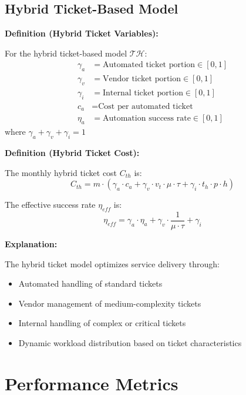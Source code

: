 \documentclass[12pt,a4paper]{article}
\newenvironment{definition}[1]
{\begin{mdframed}[style=definitionstyle]
\textbf{Definition (#1):}\par}
{\end{mdframed}}
\newenvironment{explanation}
{\begin{mdframed}[style=explanationstyle]
\textbf{Explanation:}\par}
{\end{mdframed}}
\begin{document}
\subsection{Hybrid Ticket-Based Model}
\begin{definition}{Hybrid Ticket Variables}
For the hybrid ticket-based model $\mathcal{TH}$:
\begin{align*}
    \gamma_a &= \text{Automated ticket portion} \in [0,1] \\
    \gamma_v &= \text{Vendor ticket portion} \in [0,1] \\
    \gamma_i &= \text{Internal ticket portion} \in [0,1] \\
    c_a &= \text{Cost per automated ticket} \\
    \eta_a &= \text{Automation success rate} \in [0,1]
\end{align*}
where $\gamma_a + \gamma_v + \gamma_i = 1$
\end{definition}

\begin{definition}{Hybrid Ticket Cost}
The monthly hybrid ticket cost $C_{th}$ is:
\begin{equation}
    C_{th} = m \cdot (\gamma_a \cdot c_a + \gamma_v \cdot v_t \cdot \mu \cdot \tau + \gamma_i \cdot t_h \cdot p \cdot h)
\end{equation}

The effective success rate $\eta_{eff}$ is:
\begin{equation}
    \eta_{eff} = \gamma_a \cdot \eta_a + \gamma_v \cdot \frac{1}{\mu \cdot \tau} + \gamma_i
\end{equation}
\end{definition}

\begin{explanation}
The hybrid ticket model optimizes service delivery through:
\begin{itemize}
    \item Automated handling of standard tickets
    \item Vendor management of medium-complexity tickets
    \item Internal handling of complex or critical tickets
    \item Dynamic workload distribution based on ticket characteristics
\end{itemize}
\end{explanation}

\section{Performance Metrics}
\end{document}
